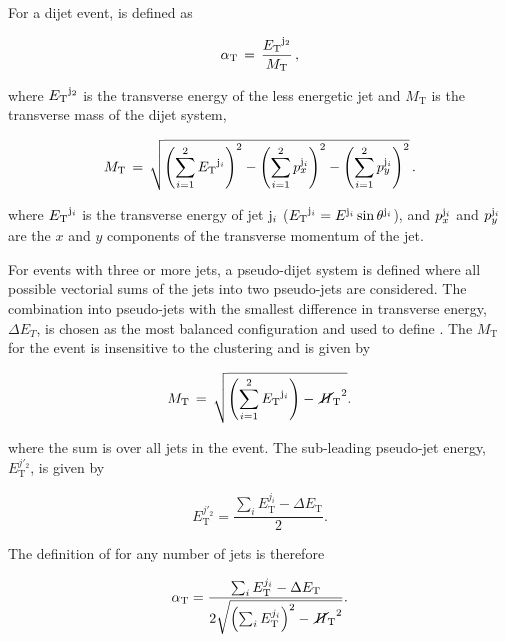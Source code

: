 For a dijet event, \alphat is defined as

\begin{equation}
\label{eq:alphat}
\alpha_{\text{T}}\, =\, \frac{{E_{\text T}}^{{\rm j}_2}}{M_\text{T}} \, ,
\end{equation}

where ${E_{\text T}}^{\rm j_2}$ is the transverse energy of the 
less energetic jet and $M_\text{T}$ is the transverse
mass of the dijet system, 

\begin{equation}
  \label{eq:mt}
  M_\text{T}\, = \,\sqrt{ \left( \sum_{i=1}^2 {E_{\text T}}^{{\rm j}_i}
    \right)^2 - \left( \sum_{i=1}^2 p_x^{{\rm j}_i} \right)^2 - \left(
      \sum_{i=1}^2 p_y^{{\rm j}_i} \right)^2} \, .
\end{equation}

where ${E_{\text T}}^{{\rm j}_i}$ is the transverse energy of jet ${\rm j}_i$ 
(${E_{\text T}}^{{\rm j}_i} = E^{{\rm j}_i}\sin\theta^{{\rm j}_i}$), and
$p_x^{{\rm j}_i}$ and $p_y^{{\rm j}_i}$ are the $x$ and $y$ components
of the transverse momentum of the jet. 

For events with three or more jets, a pseudo-dijet system is defined 
where all possible vectorial sums of the jets into two
pseudo-jets are considered. The combination into pseudo-jets 
with the smallest difference in transverse energy, $\Delta E_T$, is chosen
as the most balanced configuration and used to define \alphat. The $M_\text{T}$ for 
the event is insensitive to the clustering and is given by

\begin{equation}
  \label{eq:mt_njet}
  M_\text{T}\, = \,\sqrt{ \left( \sum_{i=1}^2 {E_{\text T}}^{{\rm{j}}_i}
    \right) - \mbox{$\,\cancel{H}_{\rm T}$}^2}.
\end{equation}

where the sum is over all jets in the event. The sub-leading pseudo-jet energy, 
$E_{\textrm{T}}^{j'_2}$, is given by

\begin{equation}
E_{\textrm{T}}^{j'_2} = \frac{\sum_{i} E_{\textrm{T}}^{j_i} - \Delta E_{\textrm{T}}}{2}.
\end{equation}

The definition of \alphat for any number of jets is therefore

\begin{equation}
  \label{eq:alphat2}
   \alpha_{\text{T}} = \frac{\sum_{i} E_{\textrm{T}}^{j_i} - \Delta E_{\textrm{T}}}{2\sqrt{\left(\sum_{i} E_{\textrm{T}}^{j_i}\right)^2 - \mbox{$\,\cancel{H}_{\rm T}$}^2}}.
\end{equation}

